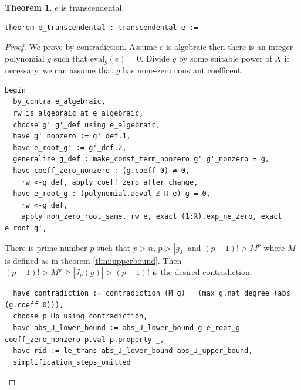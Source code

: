 \documentclass{report}
\theoremstyle{definition}
\newtheorem{theorem}{Theorem}[section]
\begin{document}
\begin{theorem}
$e$ is transcendental.

\begin{verbatim}
theorem e_transcendental : transcendental e :=
\end{verbatim}
\end{theorem}
\begin{proof}
We prove by contradiction. Assume $e$ is algebraic then there is an integer polynomial $g$ such that $\mathrm{eval}_g(e)=0$. Divide $g$ by some suitable power of $X$ if necessary, we can assume that $g$ has none-zero constant coefficent.

\begin{verbatim}
begin
  by_contra e_algebraic,
  rw is_algebraic at e_algebraic,
  choose g' g'_def using e_algebraic,
  have g'_nonzero := g'_def.1,
  have e_root_g' := g'_def.2,
  generalize g_def : make_const_term_nonzero g' g'_nonzero = g,
  have coeff_zero_nonzero : (g.coeff 0) ≠ 0,
    rw <-g_def, apply coeff_zero_after_change,
  have e_root_g : (polynomial.aeval ℤ ℝ e) g = 0,
    rw <-g_def,
    apply non_zero_root_same, rw e, exact (1:ℝ).exp_ne_zero, exact e_root_g',
\end{verbatim}

There is prime number $p$ such that $p>n$, $p>|g_0|$ and $(p-1)!>M^p$ where $M$ is defined as in theorem \ref{thm:upperbound}. Then $(p-1)!>M^p\ge|J_p(g)|>(p-1)!$ is the desired contradiction.
\begin{verbatim}
  have contradiction := contradiction (M g) _ (max g.nat_degree (abs (g.coeff 0))),
  choose p Hp using contradiction,
  have abs_J_lower_bound := abs_J_lower_bound g e_root_g coeff_zero_nonzero p.val p.property _,
  have rid := le_trans abs_J_lower_bound abs_J_upper_bound,
  simplification_steps_omitted
\end{verbatim}
\end{proof}

\end{document}
